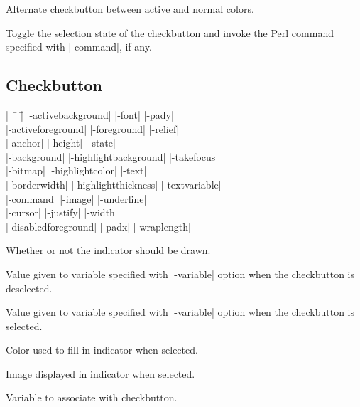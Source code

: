 \vskip5pt
\begin{enum}{1cm}

Alternate checkbutton between active and normal  colors.

Toggle the selection state of the checkbutton and invoke the Perl
command specified with |-command|, if any.

\end{enum}

\subsection*{Checkbutton}
\vspace{-4pt}

\begin{tabbing}
|                   |\=|                     |\= \kill
|-activebackground| \> |-font|               \> |-pady| \\
|-activeforeground| \> |-foreground|         \> |-relief| \\
|-anchor|           \> |-height|             \> |-state| \\
|-background|       \> |-highlightbackground|\> |-takefocus| \\
|-bitmap|           \> |-highlightcolor|     \> |-text| \\        
|-borderwidth|      \> |-highlightthickness| \> |-textvariable| \\
|-command|          \> |-image|              \> |-underline| \\   
|-cursor|	    \> |-justify|            \> |-width| \\
|-disabledforeground| \> |-padx| 	     \> |-wraplength| \\
\end{tabbing}

\vskip5pt
\begin{enum}{1cm}

 Whether  or  not the indicator should be drawn.

 Value given to variable specified with |-variable|
option when the checkbutton is deselected.

 Value given to variable specified with |-variable|
option when the checkbutton is selected.

 Color used to fill in indicator when selected.

 Image displayed in indicator when selected.

 Variable to associate with checkbutton.

\end{enum}

